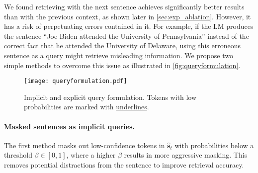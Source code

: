 We found retrieving with the next sentence achieves significantly better results than with the previous context, as shown later in \autoref{sec:exp_ablation}.
However, it has a risk of perpetuating errors contained in it.
For example, if the LM produces the sentence ``Joe Biden attended the University of Pennsylvania'' instead of the correct fact that he attended the University of Delaware, using this erroneous sentence as a query might retrieve misleading information.
We propose two simple methods to overcome this issue as illustrated in \autoref{fig:queryformulation}.

\begin{figure}[tb]
\texttt{[image: queryformulation.pdf]}
\centering
\caption{Implicit and explicit query formulation. Tokens with low probabilities are marked with \underline{underlines}.}
\label{fig:queryformulation}
\end{figure}

\paragraph{Masked sentences as implicit queries.} The first method masks out low-confidence tokens in $\hat{\bm{s}}_t$ with probabilities below a threshold $\beta \in [0, 1]$, where a higher $\beta$ results in more aggressive masking.
This removes potential distractions from the sentence to improve retrieval accuracy.

